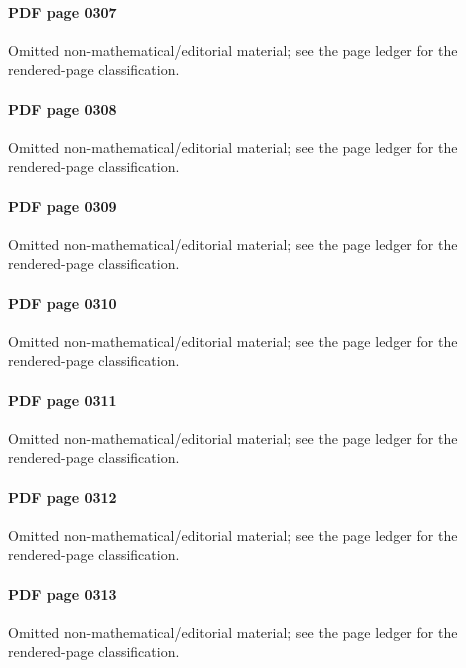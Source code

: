 \paragraph{PDF page 0307}\uses{}\label{mcrt-omitted-p0307} Omitted non-mathematical/editorial material; see the page ledger for the rendered-page classification.\par
\paragraph{PDF page 0308}\uses{}\label{mcrt-omitted-p0308} Omitted non-mathematical/editorial material; see the page ledger for the rendered-page classification.\par
\paragraph{PDF page 0309}\uses{}\label{mcrt-omitted-p0309} Omitted non-mathematical/editorial material; see the page ledger for the rendered-page classification.\par
\paragraph{PDF page 0310}\uses{}\label{mcrt-omitted-p0310} Omitted non-mathematical/editorial material; see the page ledger for the rendered-page classification.\par
\paragraph{PDF page 0311}\uses{}\label{mcrt-omitted-p0311} Omitted non-mathematical/editorial material; see the page ledger for the rendered-page classification.\par
\paragraph{PDF page 0312}\uses{}\label{mcrt-omitted-p0312} Omitted non-mathematical/editorial material; see the page ledger for the rendered-page classification.\par
\paragraph{PDF page 0313}\uses{}\label{mcrt-omitted-p0313} Omitted non-mathematical/editorial material; see the page ledger for the rendered-page classification.\par
